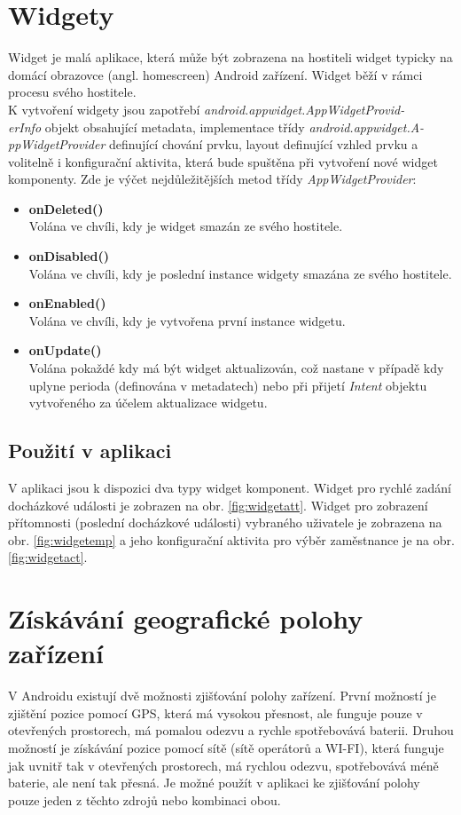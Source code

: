 \documentclass{diplomka}
\begin{document}
\section{Widgety}
Widget je malá aplikace, která může být zobrazena na hostiteli widget typicky na domácí obrazovce (angl. homescreen) Android zařízení. Widget běží v rámci procesu svého hostitele.\\ \indent
K vytvoření widgety jsou zapotřebí \emph{android.appwidget.AppWidgetProvid-\\erInfo} objekt obsahující metadata,  implementace třídy \emph{android.appwidget.A-\\ppWidgetProvider} definující chování prvku, layout definující vzhled prvku a 
volitelně i konfigurační aktivita, která bude spuštěna při vytvoření nové widget komponenty. 
Zde je výčet nejdůležitějších metod třídy \emph{AppWidgetProvider}:
\begin{itemize}[]
\item \textbf{onDeleted()}\\
Volána ve chvíli, kdy je widget smazán ze svého hostitele.
\item \textbf{onDisabled()}\\
Volána ve chvíli, kdy je poslední instance widgety smazána ze svého hostitele.
\item \textbf{onEnabled()}\\
Volána ve chvíli, kdy je vytvořena první instance widgetu.
\item \textbf{onUpdate()}\\
Volána pokaždé kdy má být widget aktualizován, což nastane v případě kdy uplyne perioda (definována v metadatech) nebo při přijetí \emph{Intent} objektu vytvořeného za účelem aktualizace widgetu. 
\end{itemize}
\subsection*{Použití v aplikaci}
V aplikaci jsou k dispozici dva typy widget komponent. Widget pro rychlé zadání docházkové události je zobrazen na obr. \ref{fig:widgetatt}. Widget pro zobrazení přítomnosti (poslední docházkové události) vybraného uživatele je zobrazena na obr. \ref{fig:widgetemp} a jeho konfigurační aktivita pro výběr zaměstnance je na obr. \ref{fig:widgetact}.


\section{Získávání geografické polohy zařízení}
V Androidu existují dvě možnosti zjišťování polohy zařízení. První možností je zjištění pozice pomocí GPS, která má vysokou přesnost, ale funguje pouze v otevřených prostorech, má pomalou odezvu a rychle spotřebovává baterii. Druhou možností je získávání pozice pomocí sítě (sítě operátorů a WI-FI), která funguje jak uvnitř tak v otevřených prostorech, má rychlou odezvu, spotřebovává méně baterie, ale není tak přesná. Je možné použít v aplikaci ke zjišťování polohy pouze jeden z těchto zdrojů nebo kombinaci obou.
\end{document}
